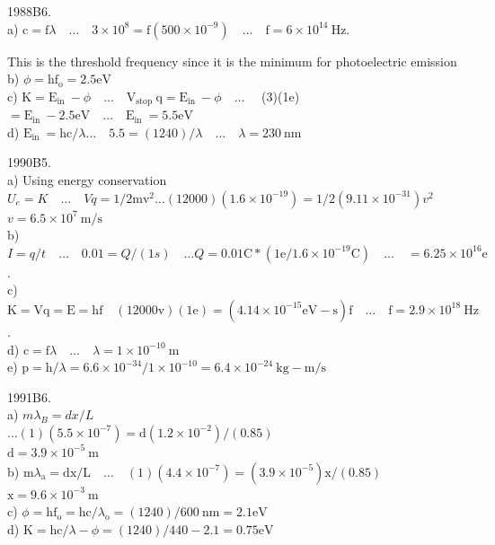 \begin{enumerate}
1988B6.\\
a) $\mathrm{c}=\mathrm{f} \lambda \quad \ldots \quad 3 \times 10^{8}=\mathrm{f}\left(500 \times 10^{-9}\right) \quad \ldots \quad \mathrm{f}=6 \times 10^{14} \mathrm{~Hz}$.

This is the threshold frequency since it is the minimum for photoelectric emission\\
b) $\phi=\mathrm{hf}_{\mathrm{o}}=2.5 \mathrm{eV}$\\
c) $\mathrm{K}=\mathrm{E}_{\text {in }}-\phi \quad \ldots \quad \mathrm{V}_{\text {stop }} \mathrm{q}=\mathrm{E}_{\text {in }}-\phi \quad \ldots \quad$ (3)(1e) $=\mathrm{E}_{\text {in }}-2.5 \mathrm{eV} \quad \ldots \quad \mathrm{E}_{\text {in }}=5.5 \mathrm{eV}$\\
d) $\mathrm{E}_{\text {in }}=\mathrm{hc} / \lambda \ldots \quad 5.5=(1240) / \lambda \quad \ldots \quad \lambda=230 \mathrm{~nm}$

1990B5.\\
a) Using energy conservation $U_{e}=K \quad \ldots \quad V q=1 / 2 \mathrm{mv}^{2} \ldots(12000)\left(1.6 \times 10^{-19}\right)=1 / 2\left(9.11 \times 10^{-31}\right) v^{2}$ $v=6.5 \times 10^{7} \mathrm{~m} / \mathrm{s}$\\
b) $I=q / t \quad \ldots \quad 0.01=Q /(1 s) \quad \ldots Q=0.01 \mathrm{C} *\left(1 \mathrm{e} / 1.6 \times 10^{-19} \mathrm{C}\right) \quad \ldots \quad=6.25 \times 10^{16} \mathrm{e}$.\\
c) $\mathrm{K}=\mathrm{Vq}=\mathrm{E}=\mathrm{hf} \quad(12000 \mathrm{v})(1 \mathrm{e})=\left(4.14 \times 10^{-15} \mathrm{eV}-\mathrm{s}\right) \mathrm{f} \quad \ldots \quad \mathrm{f}=2.9 \times 10^{18} \mathrm{~Hz}$.\\
d) $\mathrm{c}=\mathrm{f} \lambda \quad \ldots \quad \lambda=1 \times 10^{-10} \mathrm{~m}$\\
e) $\mathrm{p}=\mathrm{h} / \lambda=6.6 \times 10^{-34} / 1 \times 10^{-10}=6.4 \times 10^{-24} \mathrm{~kg}-\mathrm{m} / \mathrm{s}$

1991B6.\\
a) $m \lambda_{B}=d x / L$\\
$\ldots(1)\left(5.5 \times 10^{-7}\right)=\mathrm{d}\left(1.2 \times 10^{-2}\right) /(0.85)$\\
$\mathrm{d}=3.9 \times 10^{-5} \mathrm{~m}$\\
b) $\mathrm{m} \lambda_{\mathrm{a}}=\mathrm{dx} / \mathrm{L} \quad \ldots \quad(1)\left(4.4 \times 10^{-7}\right)=\left(3.9 \times 10^{-5}\right) \mathrm{x} /(0.85)$\\
$\mathrm{x}=9.6 \times 10^{-3} \mathrm{~m}$\\
c) $\phi=\mathrm{hf}_{\mathrm{o}}=\mathrm{hc} / \lambda_{\mathrm{o}}=(1240) / 600 \mathrm{~nm}=2.1 \mathrm{eV}$\\
d) $\mathrm{K}=\mathrm{hc} / \lambda-\phi=(1240) / 440-2.1=0.75 \mathrm{eV}$


\end{enumerate}
